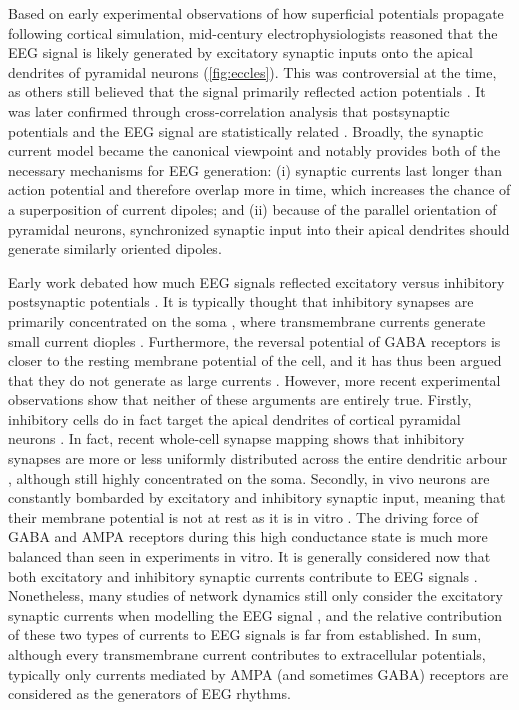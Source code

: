 Based on early experimental observations of how superficial potentials propagate following cortical simulation, mid-century electrophysiologists \cite{Eccles1951} reasoned that the EEG signal is likely generated by excitatory synaptic inputs onto the apical dendrites of pyramidal neurons (\autoref{fig:eccles}). This was controversial at the time, as others still believed that the signal primarily reflected action potentials \cite{Burns1950}. It was later confirmed through cross-correlation analysis that postsynaptic potentials and the EEG signal are statistically related \cite{KLEE1965}. Broadly, the synaptic current model became the canonical viewpoint and notably provides both of the necessary mechanisms for EEG generation: (i) synaptic currents last longer than action potential and therefore overlap more in time, which increases the chance of a superposition of current dipoles; and (ii) because of the parallel orientation of pyramidal neurons, synchronized synaptic input into their apical dendrites should generate similarly oriented dipoles.

Early work debated how much EEG signals reflected excitatory versus inhibitory postsynaptic potentials \cite{Pollen1964,Creutzfeldt1966, Creutzfeldt1966a}. It is typically thought that inhibitory synapses are primarily concentrated on the soma \cite{Telenczuk2020, Mazzoni2015,Næss2021}, where transmembrane currents generate small current dioples \cite{Ahlfors2015}. Furthermore, the reversal potential of GABA receptors is closer to the resting membrane potential of the cell, and it has thus been argued that they do not generate as large currents \cite{Buzsaki2012}. However, more recent experimental observations show that neither of these arguments are entirely true. Firstly, inhibitory cells do in fact target the apical dendrites of cortical pyramidal neurons \cite{Palmer2012}. In fact, recent whole-cell synapse mapping shows that inhibitory synapses are more or less uniformly distributed across the entire dendritic arbour \cite{Iacaruso2017}, although still highly concentrated on the soma. Secondly, in vivo neurons are constantly bombarded by excitatory and inhibitory synaptic input, meaning that their membrane potential is not at rest as it is in vitro \cite{Destexhe2003}. The driving force of GABA and AMPA receptors during this high conductance state is much more balanced than seen in experiments in vitro. It is generally considered now that both excitatory and inhibitory synaptic currents contribute to EEG signals \cite{Buzsaki2012}. Nonetheless, many studies of network dynamics still only consider the excitatory synaptic currents when modelling the EEG signal \cite{Jensen2005,McCarthy2008}, and the relative contribution of these two types of currents to EEG signals is far from established. In sum, although every transmembrane current contributes to extracellular potentials, typically only currents mediated by AMPA (and sometimes GABA) receptors are considered as the generators of EEG rhythms.

